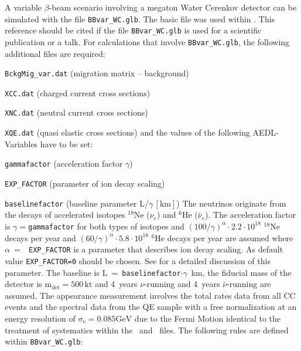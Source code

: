 A variable $\beta$-beam scenario involving a megaton Water Cerenkov detector can be simulated with the file 
{\tt BBvar\_WC.glb}. The basic file was used within \cite{Huber:2005jk}. This reference
should be cited if the file {\tt BBvar\_WC.glb} is used for a scientific publication or a talk. For calculations that
involve {\tt BBvar\_WC.glb}, the following additional files are required:
\bi
\item {\tt BckgMig\_var.dat} (migration matrix -- background)
\item {\tt XCC.dat} (charged current cross sections)
\item {\tt XNC.dat} (neutral current cross sections)
\item {\tt XQE.dat} (quasi elastic cross sections)
\ei
and the values of the following {\sf AEDL}-Variables have to be set:
\bi
\item {\tt gammafactor} (acceleration factor $\gamma$)
\item {\tt EXP\_FACTOR} (parameter of ion decay scaling)
\item {\tt baselinefactor} (baseline parameter L/$\gamma\,\left[\mathrm{km}\right]$)
\ei
The neutrinos originate from the decays of accelerated isotopes $^{18}$Ne ($\nu_e$) and $^6$He ($\bar{\nu}_e$).
The acceleration factor is $\gamma=${\tt gammafactor} for both types of isotopes and
$(100/\gamma)^\alpha\cdot2.2\cdot10^{18}$ $^{18}$Ne decays per
year and $(60/\gamma)^\alpha\cdot5.8\cdot10^{18}$ $^{6}$He decays per year are assumed where $\alpha$~=~{\tt
EXP\_FACTOR} is a parameter that describes ion decay scaling. As default value {\tt EXP\_FACTOR=0} should be chosen.
See \cite{Huber:2005jk} for a detailed discussion of this parameter. The baseline is
L~=~{\tt baselinefactor}$\cdot\gamma$~km, the
fiducial mass of the detector is $\mathrm{m_{det} = 500 \,kt}$ and 4~years $\nu$-running and 4~years
$\bar{\nu}$-running are assumed. The appearance measurement involves the total rates data from all CC events and the spectral data
from the QE sample with a free normalization at an energy resolution of $\mathrm{\sigma_e=0.085GeV}$ due to the
Fermi Motion identical to the treatment of systematics within the \TtoK\ and \TtoHK\ files. The following rules are defined within {\tt BBvar\_WC.glb}:

